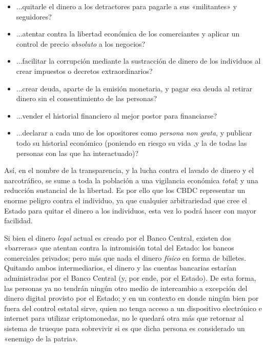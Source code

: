 \documentclass[12pt,a4paper,twoside]{book}
\begin{document}
\begin{itemize}
\item ...quitarle el dinero a los detractores para pagarle a sus «militantes» y seguidores?
\item ...atentar contra la libertad económica de los comerciantes y aplicar un control de precio \textit{absoluto} a los negocios?
\item ...facilitar la corrupción mediante la sustracción de dinero de los individuos al crear impuestos o decretos extraordinarios?
\item ...crear deuda, aparte de la emisión monetaria, y pagar esa deuda al retirar dinero sin el consentimiento de las personas?
\item ...vender el historial financiero al mejor postor para financiarse?
\item ...declarar a cada uno de los opositores como \textit{persona non grata}, y publicar todo su historial económico (poniendo en riesgo su vida ,y la de todas las personas con las que ha interactuado)?
\end{itemize}

Así, en el nombre de la transparencia, y la lucha contra el lavado de dinero y el narcotráfico, se sume a toda la población a una vigilancia económica \textit{total}; y una reducción sustancial de la libertad. Es por ello que los CBDC representar un enorme peligro contra el individuo, ya que cualquier arbitrariedad que cree el Estado para quitar el dinero a los individuos, esta vez lo podrá hacer con mayor facilidad.

Si bien el dinero \textit{legal} actual es creado por el Banco Central, existen dos «barreras» que atentan contra la intromisión total del Estado: los bancos comerciales privados; pero más que nada el dinero \textit{físico} en forma de billetes. Quitando ambos intermediarios, el dinero y las cuentas bancarias estarían administradas por el Banco Central (y, por ende, por el Estado). De esta forma, las personas ya no tendrán ningún otro medio de intercambio a excepción del dinero digital provisto por el Estado; y en un contexto en donde ningún bien por fuera del control estatal sirve, quien no tenga acceso a un dispositivo electrónico e internet para utilizar criptomonedas, no le quedará otra más que retornar al sistema de trueque para sobrevivir si es que dicha persona es considerado un «enemigo de la patria».
\end{document}
